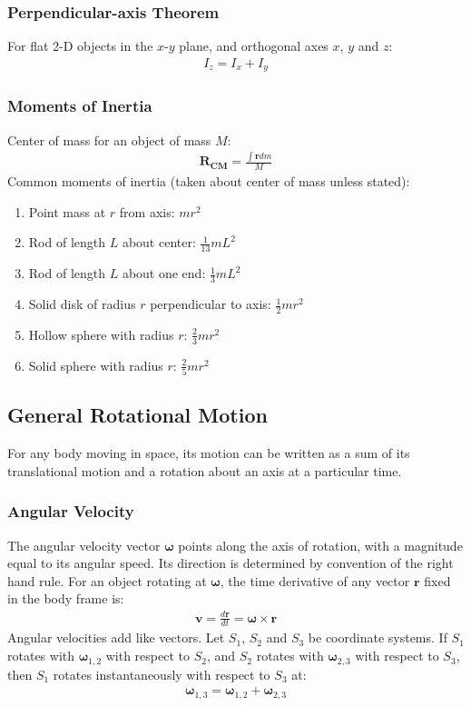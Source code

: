 \documentclass[a4paper]{article}
\newcommand{\ve}[1]{
  \ensuremath{\bm{#1}}}	               %
\begin{document}
\begin{multicols*}{2}
\subsubsection{Perpendicular-axis Theorem}
For flat 2-D objects in the $x$-$y$ plane, and orthogonal axes $x$, $y$ and $z$:
\begin{align*}
  I_z=I_x+I_y
\end{align*}
\subsubsection{Moments of Inertia}
Center of mass for an object of mass $M$:
\begin{align*}
  \ve{R_\text{CM}}=\frac{\int\ve{r}dm}{M}
\end{align*}
Common moments of inertia (taken about center of mass unless stated):
\begin{enumerate}
  \setlength{\itemsep}{2mm}
\item Point mass at $r$ from axis: $mr^2$
\item Rod of length $L$ about center: $\frac{1}{13}mL^2$
\item Rod of length $L$ about one end: $\frac{1}{3}mL^2$
\item Solid disk of radius $r$ perpendicular to axis: $\frac{1}{2}mr^2$
\item Hollow sphere with radius $r$: $\frac{2}{3}mr^2$
\item Solid sphere with radius $r$: $\frac{2}{5}mr^2$
\end{enumerate}
\subsection{General Rotational Motion}
For any body moving in space, its motion can be written as a sum of its
translational motion and a rotation about an axis at a particular time.
\subsubsection{Angular Velocity}
The angular velocity vector $\ve{\omega}$ points along the axis of rotation,
with a magnitude equal to its angular speed. Its direction is determined by
convention of the right hand rule. For an object rotating at $\ve{\omega}$, the
time derivative of any vector $\ve{r}$ fixed in the body frame is:
\begin{align*}
  \ve{v} = \frac{d\ve{r}}{dt} = \ve{\omega} \times \ve{r}
\end{align*}
Angular velocities add like vectors. Let $S_1$, $S_2$ and $S_3$ be coordinate
systems. If $S_1$ rotates with $\ve{\omega}_{1, 2}$ with respect to $S_2$, and
$S_2$ rotates with $\ve{\omega}_{2, 3}$ with respect to $S_3$, then $S_1$
rotates instantaneously with respect to $S_3$ at:
\begin{align*}
  \ve{\omega}_{1, 3} = \ve{\omega}_{1, 2} + \ve{\omega}_{2, 3}
\end{align*}

\end{multicols*}
\end{document}
